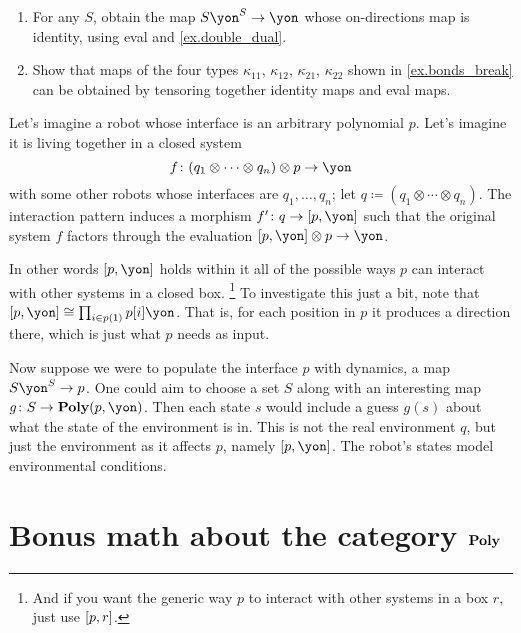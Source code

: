 \documentclass[DynamicalBook]{subfiles}
\begin{document}
\begin{exercise}
\begin{enumerate}
	\item For any $S$, obtain the map $S\yon^S\to\yon$ whose on-directions map is identity, using eval and \cref{ex.double_dual}.
	\item Show that maps of the four types $\kappa_{11}$, $\kappa_{12}$, $\kappa_{21}$, $\kappa_{22}$ shown in \cref{ex.bonds_break} can be obtained by tensoring together identity maps and eval maps.
\qedhere
\end{enumerate}
\end{exercise}

\begin{example}
Let's imagine a robot whose interface is an arbitrary polynomial $p$. Let's imagine it is living together in a closed system
\[
	f\colon (q_1\otimes\cdots\otimes q_n)\otimes p\to \yon
\]
with some other robots whose interfaces are $q_1,\ldots,q_n$; let $q\coloneqq(q_1\otimes\cdots\otimes q_n)$. The interaction pattern induces a morphism $f'\colon q\to \ihom{p,\yon}$ such that the original system $f$ factors through the evaluation $\ihom{p,\yon}\otimes p\to \yon$.

In other words $\ihom{p,\yon}$ holds within it all of the possible ways $p$ can interact with other systems in a closed box.%
\footnote{And if you want the generic way $p$ to interact with other systems in a box $r$, just use $[p,r]$.}
To investigate this just a bit, note that $\ihom{p,\yon}\cong\prod_{i\in p(\1)}p[i]\yon$. That is, for each position in $p$ it produces a direction there, which is just what $p$ needs as input.

Now suppose we were to populate the interface $p$ with dynamics, a map $S\yon^S\to p$. One could aim to choose a set $S$ along with an interesting map $g\colon S\to\poly(p,\yon)$. Then each state $s$ would include a guess $g(s)$ about what the state of the environment is in. This is not the real environment $q$, but just the environment as it affects $p$, namely $\ihom{p,\yon}$. The robot's states model environmental conditions.
\end{example}


\section{Bonus math about the category $\textbf{Poly}$}\label{sec.bonus_poly}
\end{document}
